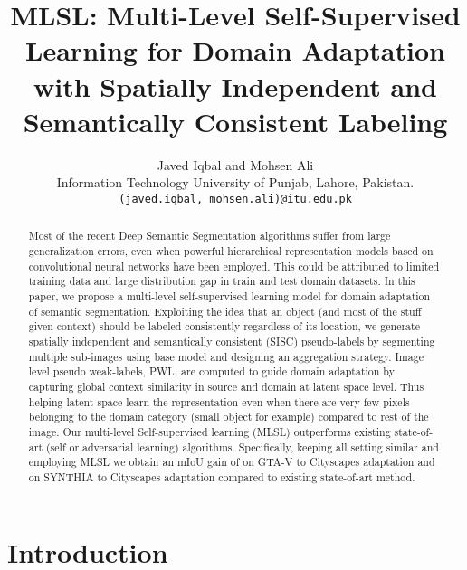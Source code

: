 \documentclass[10pt,twocolumn,letterpaper]{article}
\begin{document}
\title{MLSL: Multi-Level Self-Supervised Learning for Domain Adaptation with Spatially Independent and Semantically Consistent Labeling}

\author{Javed Iqbal and Mohsen Ali \\
Information Technology University of Punjab, Lahore, Pakistan.\\
{\tt\small (javed.iqbal, mohsen.ali)@itu.edu.pk}
}



\maketitle
\ifwacvfinal\thispagestyle{empty}\fi

\begin{abstract}
Most of the recent Deep Semantic Segmentation algorithms suffer from large generalization errors, even when powerful hierarchical representation models based on convolutional neural networks have been employed.  
This could be attributed to limited training data and large distribution gap in train and test domain datasets.
In this paper, we propose a multi-level self-supervised learning model for domain adaptation of semantic segmentation.  
Exploiting the idea that an object (and most of the stuff given context) should be labeled consistently regardless of its location, we generate spatially independent and semantically consistent (SISC) pseudo-labels by segmenting multiple sub-images using base model and designing an aggregation strategy.
Image level pseudo weak-labels, PWL, are computed to guide domain adaptation by capturing global context similarity in source and domain at latent space level. Thus helping latent space learn the representation even when there are very few pixels belonging to the domain category (small object for example) compared to rest of the image.   
Our multi-level Self-supervised learning (MLSL) outperforms existing state-of-art (self or adversarial learning) algorithms. Specifically, keeping all setting similar and employing MLSL we obtain an mIoU gain of  on GTA-V to Cityscapes adaptation and  on SYNTHIA to Cityscapes adaptation compared to existing state-of-art method.


\end{abstract}
\vspace{-0.4cm}
\section{Introduction}
\vspace{-0.2cm}
\label{sec:intro}
\end{document}
